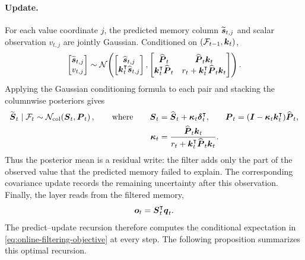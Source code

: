 \documentclass[11pt,letterpaper,logo]{yalearxiv}
\begin{document}
\paragraph{Update.}
For each value coordinate $j$, the predicted memory column $\widetilde{\boldsymbol{s}}_{t,j}$ and scalar
observation $v_{t,j}$ are jointly Gaussian. Conditioned on $(\mathcal{F}_{t-1},\boldsymbol{k}_t)$,
\begin{equation}
  \begin{bmatrix}
    \widetilde{\boldsymbol{s}}_{t,j} \\ v_{t,j}
  \end{bmatrix}
  \sim
  \mathcal N\!\left(
  \begin{bmatrix}
    \widehat{\boldsymbol{s}}_{t,j} \\ \boldsymbol{k}_t^{\intercal}\widehat{\boldsymbol{s}}_{t,j}
  \end{bmatrix},
  \begin{bmatrix}
    \widehat{\boldsymbol{P}}_t & \widehat{\boldsymbol{P}}_t\boldsymbol{k}_t \\
    \boldsymbol{k}_t^{\intercal}\widehat{\boldsymbol{P}}_t
    & r_t+\boldsymbol{k}_t^{\intercal}\widehat{\boldsymbol{P}}_t\boldsymbol{k}_t
  \end{bmatrix}
  \right).
  \label{eq:kalman-joint-coordinate}
\end{equation}
Applying the Gaussian conditioning formula to each pair and stacking the columnwise posteriors gives
\begin{equation}
\begin{alignedat}{3}
  \widetilde{\boldsymbol{S}}_t\mid\mathcal{F}_t
  &\sim\mathcal N_{\mathrm{col}}\!\left(\boldsymbol{S}_t,\boldsymbol{P}_t\right),
  \qquad\text{where}\qquad &
  \boldsymbol{S}_t
  &=\widehat{\boldsymbol{S}}_t+\boldsymbol{\kappa}_t\boldsymbol{\delta}_t^{\intercal},
  \qquad &
  \boldsymbol{P}_t
  &=(\boldsymbol{I}-\boldsymbol{\kappa}_t\boldsymbol{k}_t^{\intercal})\widehat{\boldsymbol{P}}_t, \\
  &&
  \boldsymbol{\kappa}_t
  &=\frac{\widehat{\boldsymbol{P}}_t\boldsymbol{k}_t}
  {r_t+\boldsymbol{k}_t^{\intercal}\widehat{\boldsymbol{P}}_t\boldsymbol{k}_t}.
\end{alignedat}
  \label{eq:kalman-update}
\end{equation}
Thus the posterior mean is a residual write: the filter adds only the part of the observed value
that the predicted memory failed to explain. The corresponding covariance update records the
remaining uncertainty after this observation.
Finally, the layer reads from the filtered memory,
\begin{equation}
  \boldsymbol{o}_t = \boldsymbol{S}_t^{\intercal}\boldsymbol{q}_t .
  \label{eq:kalman-read}
\end{equation}
The predict--update recursion therefore computes the conditional expectation in
\eqref{eq:online-filtering-objective} at every step.
The following proposition summarizes this optimal recursion.
\end{document}
